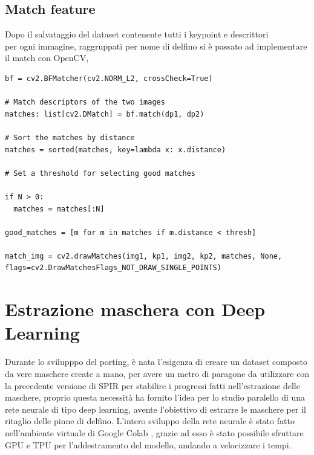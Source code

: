 \documentclass[a4paper,12pt]{report}
\begin{document}
      \subsection{Match feature}
      Dopo il salvataggio del dataset contenente tutti i keypoint e descrittori 
      \\ per ogni immagine, raggruppati per nome di delfino si è passato ad implementare il match con OpenCV,
      \begin{lstlisting}
bf = cv2.BFMatcher(cv2.NORM_L2, crossCheck=True)

# Match descriptors of the two images
matches: list[cv2.DMatch] = bf.match(dp1, dp2)

# Sort the matches by distance
matches = sorted(matches, key=lambda x: x.distance)

# Set a threshold for selecting good matches

if N > 0:
  matches = matches[:N]

good_matches = [m for m in matches if m.distance < thresh]

match_img = cv2.drawMatches(img1, kp1, img2, kp2, matches, None, flags=cv2.DrawMatchesFlags_NOT_DRAW_SINGLE_POINTS)

      \end{lstlisting}

      \newpage
    \section{Estrazione maschera con Deep Learning}
      Durante lo svilupppo del porting, è nata l'esigenza di creare un dataset
      composto da vere maschere create a mano, per avere un metro di paragone da
      utilizzare con la precedente versione di SPIR per stabilire i progressi fatti nell'estrazione
      delle maschere, proprio questa necessità ha fornito l'idea per lo studio paralello di
      una rete neurale di tipo deep learning, avente l'obiettivo di estrarre le maschere per il 
      ritaglio delle pinne di delfino.
      L'intero sviluppo della rete neurale è stato fatto 
      nell'ambiente virtuale di Google Colab \cite{colab}, grazie ad esso è stato 
      possibile sfruttare GPU e TPU per l'addestramento del modello, andando a velocizzare i tempi.
\end{document}
